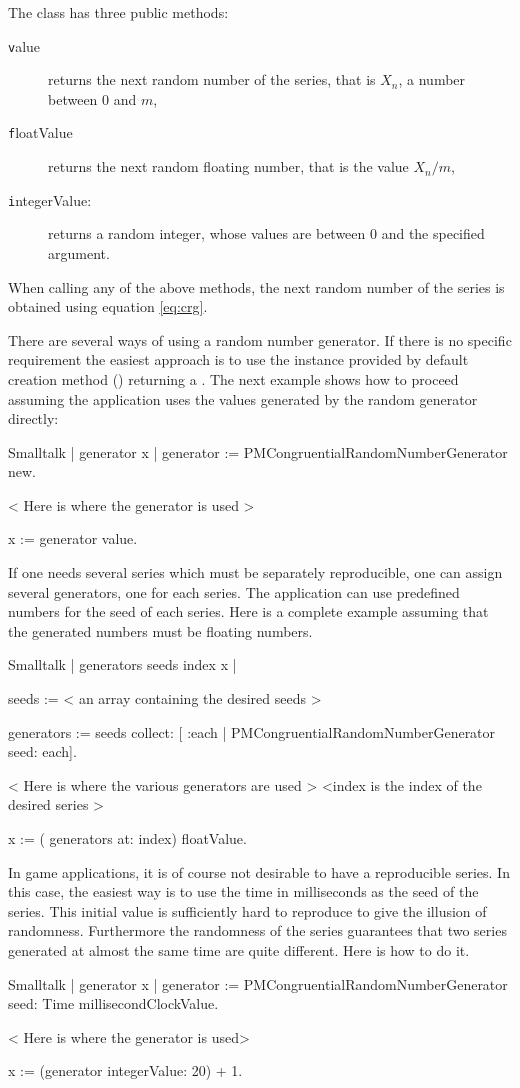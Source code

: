 \noindent The class  has
three public methods:
\begin{description}
  \item[\texttt value] returns the next random number of the series,
  that is $X_n$, a number between $0$ and $m$,
  \item[\texttt floatValue] returns the next random floating number,
  that is the value $X_n / m$,
  \item[\texttt integerValue:] returns a random integer, whose values
  are between 0 and the specified argument.
\end{description}
When calling any of the above methods, the next random number of
the series is obtained using equation \ref{eq:crg}.

There are several ways of using a random number generator. If
there is no specific requirement the easiest approach is to use
the instance provided by default creation method ()
returning a . The next example shows how to
proceed assuming the application uses the values generated by the
random generator directly:
\begin{displaycode}{Smalltalk}
 | generator x |
 generator := PMCongruentialRandomNumberGenerator new.

 < Here is where the generator is used >

 x := generator value.
\end{displaycode}

If one needs several series which must be separately reproducible, one can assign several generators, one for each series.
The application can use predefined numbers for the seed of each
series. Here is a complete example assuming that the generated
numbers must be floating numbers.
\begin{displaycode}{Smalltalk}
 | generators seeds index x |

 seeds := < an array containing the desired seeds >

 generators := seeds collect:
           [ :each | PMCongruentialRandomNumberGenerator seed: each].
  
 < Here is where the various generators  are used >
 <index is the index of the desired series >

 x := ( generators at: index) floatValue.
\end{displaycode}

In game applications, it is of course not desirable to have a reproducible series.
In this case, the easiest way is to use the time in milliseconds as the seed of the series.
This initial value is sufficiently hard to reproduce to give the illusion of randomness.
Furthermore the randomness of the series guarantees that two series generated at almost the same time are quite different.
Here is how to do it.
\begin{displaycode}{Smalltalk}
 | generator x |
 generator := PMCongruentialRandomNumberGenerator
                        seed: Time millisecondClockValue.

 < Here is where the generator is used>

 x := (generator integerValue: 20) + 1.
\end{displaycode}

